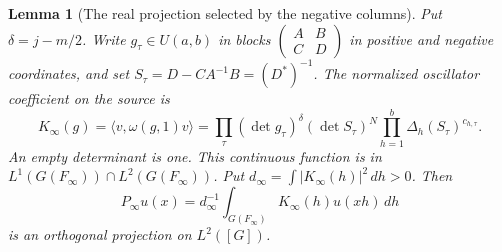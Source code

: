\documentclass[a4paper,11pt]{article}
\newtheorem{lemma}[proposition]{Lemma}
\theoremstyle{definition}
\theoremstyle{remark}
\numberwithin{equation}{section}
\begin{document}
\begin{lemma}[The real projection selected by the negative columns]
\leavevmode\label{lem:negativecoefficient812}
Put \(\delta=j-m/2\). Write \(g_\tau\in U(a,b)\) in blocks
\(\left(\begin{smallmatrix}A&B\\ C&D\end{smallmatrix}\right)\)
in positive and negative coordinates, and set
\(S_\tau=D-CA^{-1}B=(D^*)^{-1}\).
The normalized oscillator coefficient on the source is
\[
 K_\infty(g)=\langle v,\omega(g,1)v\rangle
 =\prod_\tau (\det g_\tau)^\delta(\det S_\tau)^N
           \prod_{h=1}^b\Delta_h(S_\tau)^{c_{h,\tau}} .
\]
An empty determinant is one. This continuous function is in
\(L^1(G(F_\infty))\cap L^2(G(F_\infty))\). Put
\(d_\infty=\int|K_\infty(h)|^2\,dh>0\). Then
\[
 P_\infty u(x)=d_\infty^{-1}\int_{G(F_\infty)}
                       K_\infty(h)u(xh)\,dh
\]
is an orthogonal projection on \(L^2([G])\).
\end{lemma}
\end{document}
